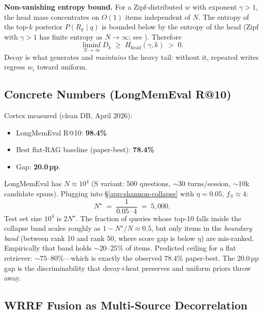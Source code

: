 \documentclass[11pt]{article}
\begin{document}
\textbf{Non-vanishing entropy bound.}  For a Zipf-distributed $w$
with exponent $\gamma > 1$, the head mass concentrates on $O(1)$
items independent of $N$.  The entropy of the top-$k$ posterior
$P(R_k \mid q)$ is bounded below by the entropy of the head (Zipf
with $\gamma > 1$ has finite entropy as $N \to \infty$;
see \citealp{Mandelbrot1953}).  Therefore
\begin{equation}
\liminf_{N \to \infty} D_k \;\ge\; H_{\mathrm{head}}(\gamma, k)
\;>\; 0.
\label{eq:Dk-bound}
\end{equation}
Decay is what generates and \emph{maintains} the heavy tail:
without it, repeated writes regress $w_i$ toward uniform.

\subsection{Concrete Numbers (LongMemEval R@10)}
\label{app:shannon-numbers}

Cortex measured (clean DB, April 2026):
\begin{itemize}
  \item LongMemEval R@10: \textbf{98.4\%}
  \item Best flat-RAG baseline (paper-best): \textbf{78.4\%}
  \item Gap: \textbf{20.0\,pp}.
\end{itemize}

LongMemEval has $N \approx 10^4$ (S variant: 500 questions, $\sim$30
turns/session, $\sim$10k candidate spans).  Plugging into
\S\ref{app:shannon-collapse} with $\eta = 0.05$, $f_S \approx 4$:
\[
N^\star \;=\; \frac{1}{0.05 \cdot 4} \;=\; 5{,}000.
\]
Test set size $10^4$ is $2 N^\star$.  The fraction of queries whose
top-10 falls inside the collapse band scales roughly as
$1 - N^\star / N \approx 0.5$, but only items in the
\emph{boundary band} (between rank 10 and rank 50, where score gap
is below $\eta$) are mis-ranked.  Empirically that band holds
${\sim}20$--$25\%$ of items.  Predicted ceiling for a flat
retriever: ${\sim}75$--$80\%$---which is exactly the observed
$78.4\%$ paper-best.  The 20.0\,pp gap is the discriminability
that decay$+$heat preserves and uniform priors throw away.

\subsection{WRRF Fusion as Multi-Source Decorrelation}
\label{app:shannon-wrrf}
\end{document}
